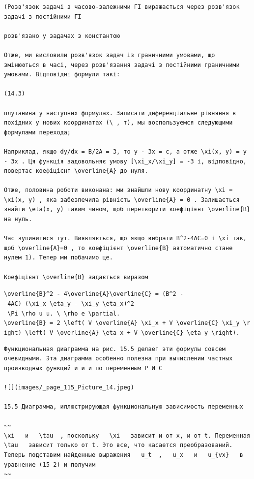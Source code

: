 \documentclass[
  ukrainian,
]{article}
\begin{document}
\begin{verbatim}
(Розв'язок задачі з часово-залежними ГІ виражається через розв'язок задачі з постійними ГІ

розв'язано у задачах з константою

Отже, ми висловили розв'язок задач із граничними умовами, що змінюються в часі, через розв'язання задачі з постійними граничними умовами. Відповідні формули такі:

(14.3)

плутанина у наступних формулах. Записати диференціальне рівняння в похідних у нових координатах (\ , т), мы воспользуемся следующими формулами перехода;

Наприклад, якщо dy/dx = B/2A = 3, то y - 3x = c, а отже \xi(x, y) = y - 3x . Ця функція задовольняє умову [\xi_x/\xi_y] = -3 і, відповідно, повертає коефіцієнт \overline{A} до нуля.

Отже, половина роботи виконана: ми знайшли нову координатну \xi = \xi(x, y) , яка забезпечила рівність \overline{A} = 0 . Залишається знайти \eta(x, y) таким чином, щоб перетворити коефіцієнт \overline{B} на нуль.

Час зупинитися тут. Виявляється, що якщо вибрати B^2-4AC=0 і \xi так, щоб \overline{A}=0 , то коефіцієнт \overline{B} автоматично стане нулем 1). Тепер ми побачимо це.

Коефіцієнт \overline{B} задається виразом
\end{verbatim}

\texttt{\textbackslash{}overline\{B\}\^{}2\ -\ 4\textbackslash{}overline\{A\}\textbackslash{}overline\{C\}\ =\ (B\^{}2\ -\ 4AC)\ (\textbackslash{}xi\_x\ \textbackslash{}eta\_y\ -\ \textbackslash{}xi\_y\ \textbackslash{}eta\_x)\^{}2\ -\ \textbackslash{}Pi\ \textbackslash{}rho\ u\ u.\ \textbackslash{}\ \textbackslash{}rho\ e\ \textbackslash{}partial.}
\texttt{\textbackslash{}overline\{B\}\ =\ 2\ \textbackslash{}left(\ V\ \textbackslash{}overline\{A\}\ \textbackslash{}xi\_x\ +\ V\ \textbackslash{}overline\{C\}\ \textbackslash{}xi\_y\ \textbackslash{}right)\ \textbackslash{}left(\ V\ \textbackslash{}overline\{A\}\ \textbackslash{}eta\_x\ +\ V\ \textbackslash{}overline\{C\}\ \textbackslash{}eta\_y\ \textbackslash{}right).}

\begin{verbatim}
Функциональная диаграмма на рис. 15.5 делает эти формулы совсем очевидными. Эта диаграмма особенно полезна при вычислении частных производных функций и и и по переменным Р И С

![](images/_page_115_Picture_14.jpeg)

15.5 Диаграмма, иллюстрирующая функциональную зависимость переменных

~~
\xi   и   \tau  , поскольку   \xi   зависит и от x, и от t. Переменная   \tau   зависит только от t. Это все, что касается преобразований. Теперь подставим найденные выражения   u_t  ,   u_x   и   u_{vx}   в уравнение (15 2) и получим
~~
\end{verbatim}
\end{document}
